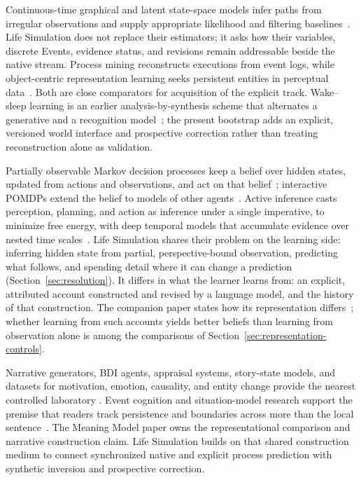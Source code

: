 \documentclass[10pt]{article}
\begin{document}
Continuous-time graphical and latent state-space models infer paths from
irregular observations and supply appropriate likelihood and filtering
baselines~\cite{nodelmanSheltonKoller2002ctbn,rubanova2019latentOde}. Life
Simulation does not replace their estimators; it asks how their variables,
discrete Events, evidence status, and revisions remain addressable beside the
native stream. Process mining reconstructs executions from event logs, while
object-centric representation learning seeks persistent entities in perceptual
data~\cite{vanDerAalst2016processMining,locatello2020slotAttention}. Both are
close comparators for acquisition of the explicit track. Wake--sleep learning
is an earlier analysis-by-synthesis scheme that alternates a generative and a
recognition model~\cite{hintonDayanFreyNeal1995wakeSleep}; the present bootstrap
adds an explicit, versioned world interface and prospective correction rather
than treating reconstruction alone as validation.

Partially observable Markov decision processes keep a belief over hidden
states, updated from actions and observations, and act on that
belief~\cite{kaelbling1998pomdp}; interactive POMDPs extend the belief to
models of other agents~\cite{gmytrasiewiczDoshi2005}. Active inference casts
perception, planning, and action as inference under a single imperative, to
minimize free energy, with deep temporal models that accumulate evidence over
nested time scales~\cite{parrPezzuloFriston2022,fristonEtAl2017deepTemporal}.
Life Simulation shares their problem on the learning side: inferring hidden
state from partial, perspective-bound observation, predicting what follows, and
spending detail where it can change a prediction (Section~\ref{sec:resolution}).
It differs in what the learner learns from: an explicit, attributed account
constructed and revised by a language model, and the history of that
construction. The companion paper states how its representation
differs~\cite{westerbergMeaning2026}; whether learning from such accounts yields
better beliefs than learning from observation alone is among the comparisons of
Section~\ref{sec:representation-controls}.

Narrative generators, BDI agents, appraisal systems, story-state models, and
datasets for motivation, emotion, causality, and entity change provide the
nearest controlled laboratory
\cite{riedl2010,raoGeorgeff1995,gebhard2005,rashkin2018,
mostafazadeh2020glucose,dalvi2018}. Event cognition and situation-model research
support the premise that readers track persistence and boundaries across more
than the local sentence~\cite{zacksEtAl2007event,zwaanRadvansky1998}. The
Meaning Model paper owns the representational comparison and narrative
construction claim. Life Simulation builds on that shared construction medium
to connect synchronized native and explicit process prediction with synthetic
inversion and prospective correction.
\end{document}
